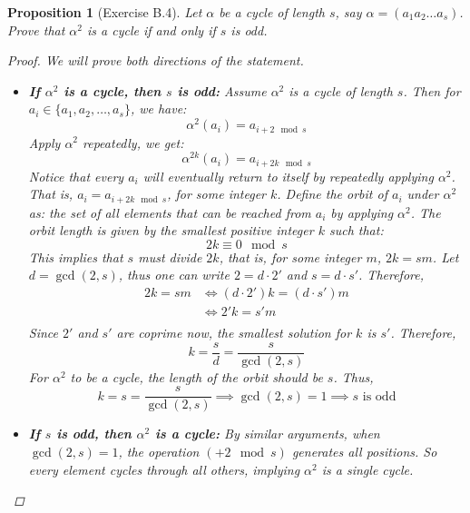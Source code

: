\documentclass[12pt]{article}
\newtheorem{proposition}{Proposition}
\begin{document}
\begin{proposition}[Exercise B.4]
  Let $\alpha$ be a cycle of length $s$, say $\alpha = (a_1 a_2 \ldots a_s)$.
  Prove that $\alpha^2$ is a cycle if and only if $s$ is odd.
  \begin{proof}
    We will prove both directions of the statement.
    \begin{itemize}
      \item \textbf{If $\alpha^2$ is a cycle, then $s$ is odd:}
            Assume $\alpha^2$ is a cycle of length $s$.
            Then for $a_i \in \{a_1, a_2, \ldots, a_s\}$, we have:
            \[
              \alpha^2(a_i) = a_{i + 2 \mod s}
            \]
            Apply $\alpha^2$ repeatedly, we get:
            \[
              \alpha^{2k}(a_i) = a_{i + 2k \mod s}
            \]
            Notice that every $a_i$ will eventually return to itself by repeatedly applying $\alpha^2$.
            That is, $a_i = a_{i + 2k \mod s}$, for some integer $k$.
            Define the orbit of $a_i$ under $\alpha^2$ as: the set of all elements that can be reached from $a_i$ by applying $\alpha^2$.
            The orbit length is given by the smallest positive integer $k$ such that:
            \[
              2k \equiv 0 \mod s
            \]
            This implies that $s$ must divide $2k$, that is, for some integer $m$, $2k = sm$.
            Let $d = \gcd(2, s)$, thus one can write $2 = d \cdot 2'$ and $s = d \cdot s'$.
            Therefore,
            \begin{align*}
              2k = sm & \iff (d \cdot 2')k = (d \cdot s')m \\
                      & \iff 2'k = s'm                     \\
            \end{align*}
            Since $2'$ and $s'$ are coprime now, the smallest solution for $k$ is $s'$.
            Therefore,
            \[
              k = \frac{s}{d} = \frac{s}{\gcd(2, s)}
            \]
            For $\alpha^2$ to be a cycle, the length of the orbit should be $s$. Thus,
            \[
              k = s = \frac{s}{\gcd(2, s)} \implies \gcd(2, s) = 1 \implies s \text{ is odd}
            \]
      \item \textbf{If $s$ is odd, then $\alpha^2$ is a cycle:}
            By similar arguments, when $\gcd(2, s) = 1$, the operation $(+2 \mod s)$ generates all positions.
            So every element cycles through all others, implying $\alpha^2$ is a single cycle.
    \end{itemize}
  \end{proof}
\end{proposition}
\end{document}

